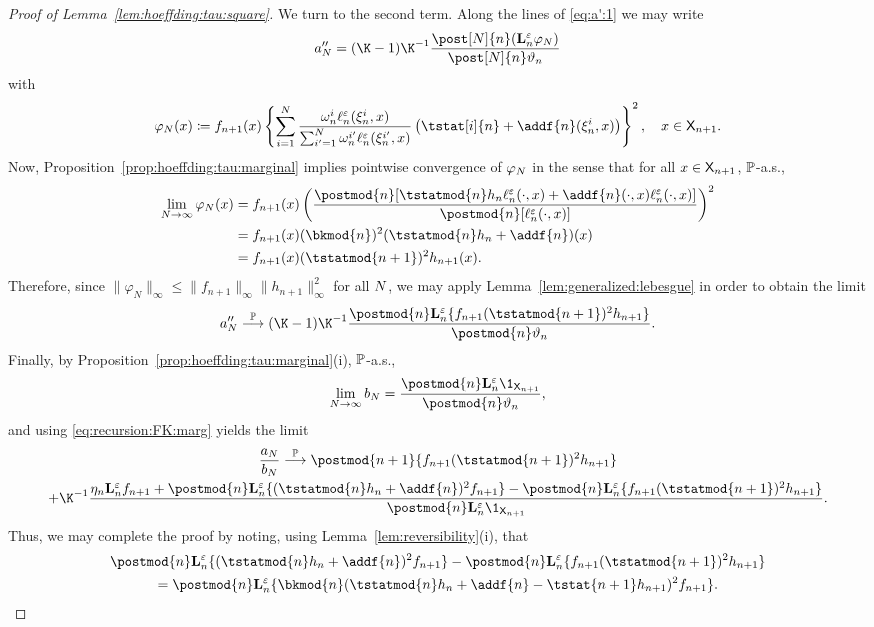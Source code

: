 \begin{proof}[Proof of Lemma~\ref{lem:hoeffding:tau:square}]
We turn to the second term. Along the lines of \eqref{eq:a':1} we may write  
$$
a_\N'' = (\K - 1) \K^{-1} \frac{\post[\N]{n}(\ukmod{n} \varphi_N)}{\post[\N]{n} \adjfuncforward{n}}
$$
with
\[
\varphi_\N(x) \eqdef f_{n+1}(x) \left\{ \sum_{i = 1}^\N \frac{\ewght{n}{i} \udmod{n}(\epart{n}{i}, x)}{\sum_{i' = 1}^{\N} \ewght{n}{i'} \udmod{n} (\epart{n}{i'}, x)} \left( \tstat[i]{n} + \addf{n}(\epart{n}{i}, x) \right) \right\}^2, \quad x \in \Xset_{n + 1}. 
\]
Now, Proposition~\ref{prop:hoeffding:tau:marginal} implies pointwise convergence of $\varphi_N$ in the sense that for all $x \in \mathsf{X}_{n + 1}$, $\mathbb{P}$-a.s., 
\begin{align*}
\lim_{\N \to \infty} \varphi_\N(x) &= f_{n + 1}(x) \left(\frac{\postmod{n}[\tstatmod{n} h_n \udmod{n}(\cdot, x) + \addf{n}(\cdot, x) \udmod{n}(\cdot, x)]}{\postmod{n}[\udmod{n}(\cdot, x)]} \right)^2 \\
&= f_{n + 1}(x) (\bkmod{n})^2(\tstatmod{n} h_n + \addf{n})(x) \\
&= f_{n + 1}(x) (\tstatmod{n + 1})^2 h_{n + 1}(x). 
\end{align*}
Therefore, since $\| \varphi_N \|_\infty \leq \| f_{n + 1} \|_\infty \| h_{n + 1} \|^2_\infty$ for all $N$, we may apply Lemma~\ref{lem:generalized:lebesgue} in order to obtain the limit  
\[
a_\N'' \pplim (\K - 1) \K^{-1} \frac{\postmod{n} \ukmod{n}\{f_{n + 1} (\tstatmod{n + 1})^2 h_{n + 1}\}}{\postmod{n}\adjfuncforward{n}}. 
\]
Finally, by Proposition~\ref{prop:hoeffding:tau:marginal}(i), $\mathbb{P}$-a.s., 
\begin{equation} \label{eq:b:lim}
\lim_{\N \to \infty} b_\N = \frac{\postmod{n} \ukmod{n} \1_{\Xset_{n + 1}}}{\postmod{n} \adjfuncforward{n}}, 
\end{equation}
and using \eqref{eq:recursion:FK:marg} yields the limit
\begin{multline}
\frac{a_\N}{b_\N} \pplim \postmod{n + 1}\{f_{n + 1} (\tstatmod{n + 1})^2 h_{n + 1}\} \\
+ \K^{-1} \frac{\eta_n \ukmod{n} f_{n + 1} + \postmod{n} \ukmod{n}\{(\tstatmod{n} h_n +\addf{n})^2 f_{n + 1}\} - \postmod{n} \ukmod{n}\{f_{n + 1} (\tstatmod{n+1})^2 h_{n + 1}\}}{\postmod{n} \ukmod{n} \1_{\Xset_{n + 1}}}.
\end{multline}
Thus, we may complete the proof by noting, using Lemma~\ref{lem:reversibility}(i), that
\begin{multline*}
\postmod{n} \ukmod{n}\{(\tstatmod{n} h_n +\addf{n})^2 f_{n + 1}\} - \postmod{n} \ukmod{n}\{f_{n + 1} (\tstatmod{n + 1})^2 h_{n + 1}\} \\
= \postmod{n} \ukmod{n} \{ \bkmod{n}(\tstatmod{n} h_n + \addf{n} - \tstat{n + 1} h_{n + 1})^2 f_{n+1}\}.  
\end{multline*}
\end{proof}

